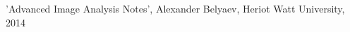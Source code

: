 \documentclass[a4paper, 10pt, conference] {article}
\begin{document}
\begin{thebibliography}{99}

'Advanced Image Analysis Notes', Alexander Belyaev, Heriot Watt University, 2014
\end{thebibliography}
\end{document}
